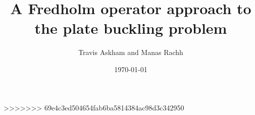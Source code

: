 \documentclass[preprint,12pt]{article}
\title{A Fredholm operator approach to the plate
buckling problem}
\author{Travis Askham and Manas Rachh}
\date{\today}
\begin{document}
\maketitle









>>>>>>> 69e4c3ed504654fab6ba5814384ac98d3c342950





\end{document}
